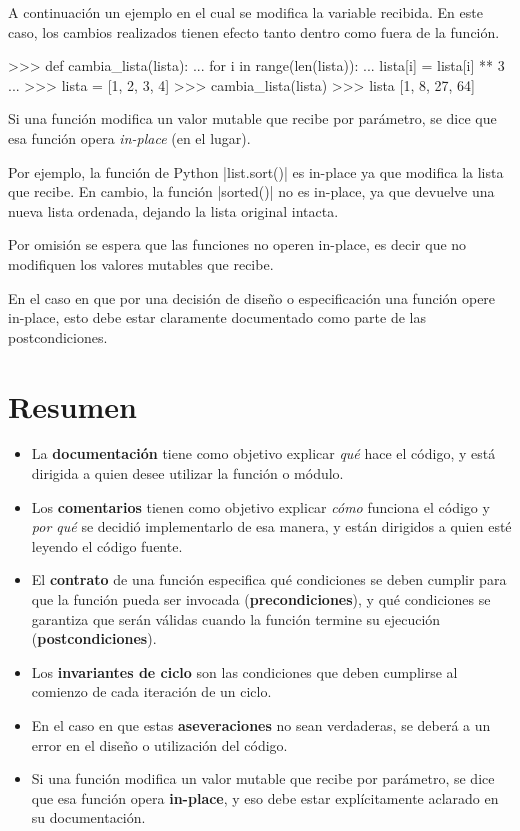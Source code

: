 A continuación un ejemplo en el cual se modifica la variable recibida. En este
caso, los cambios realizados tienen efecto tanto dentro como fuera de la
función.

\begin{codigo-python-sn}
>>> def cambia_lista(lista):
...     for i in range(len(lista)):
...         lista[i] = lista[i] ** 3
...
>>> lista = [1, 2, 3, 4]
>>> cambia_lista(lista)
>>> lista
[1, 8, 27, 64]
\end{codigo-python-sn}

\begin{observacion}
Si una función modifica un valor mutable que recibe por parámetro, se dice
que esa función opera \emph{in-place} (en el lugar).
\end{observacion}

Por ejemplo, la función de Python |list.sort()| es in-place ya que modifica la
lista que recibe.  En cambio, la función |sorted()| no es in-place, ya que
devuelve una nueva lista ordenada, dejando la lista original intacta.

\begin{atencion}
Por omisión se espera que las funciones no operen in-place, es decir que no
modifiquen los valores mutables que recibe.

En el caso en que por una decisión de diseño o especificación una función opere
in-place, esto debe estar claramente documentado como parte de las postcondiciones.
\end{atencion}

\section{Resumen}

\begin{itemize}
\item La \textbf{documentación} tiene como objetivo explicar \emph{qué} hace el código,
    y está dirigida a quien desee utilizar la función o módulo.
\item Los \textbf{comentarios} tienen como objetivo explicar \emph{cómo} funciona el
    código y \emph{por qué} se decidió implementarlo de esa manera, y están dirigidos a
    quien esté leyendo el código fuente.
\item El \textbf{contrato} de una función especifica qué condiciones se deben
    cumplir para que la función pueda ser invocada (\textbf{precondiciones}),
    y qué condiciones se garantiza que serán válidas cuando la función termine
    su ejecución (\textbf{postcondiciones}).
\item Los \textbf{invariantes de ciclo} son las condiciones que deben
cumplirse al comienzo de cada iteración de un ciclo.
\item En el caso en que estas \textbf{aseveraciones} no sean verdaderas, se
deberá a un error en el diseño o utilización del código.
\item Si una función modifica un valor mutable que recibe por parámetro, se dice
que esa función opera \textbf{in-place}, y eso debe estar explícitamente aclarado
en su documentación.
\end{itemize}

